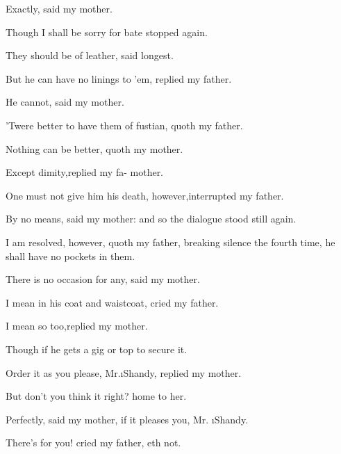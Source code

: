 \documentclass[twoside]{article}
\begin{document}
Exactly, said my mother.\tsh

\tsh Though I shall be sorry for\break
{}
bate stopped again.

\tsh They should be of leather, said\break
{}
longest.

But he can have no linings to ’em,\break
replied my father.\tsh

He cannot, said my mother.

’Twere better to have them of fustian,\break
quoth my father.

Nothing can be better, quoth my\break
mother.\tsh

\tsh Except dimity,\tsk replied my fa-\break 
{}
mother.

\tsh One must not give him his death,\break
however,\tsk interrupted my father.

By no means, said my mother:\tsh\break
and so the dialogue stood still again.



\topstrut I am resolved, however, quoth my\break 
father, breaking silence the fourth time,\break
he shall have no pockets in them.\tsh

\tsk There is no occasion for any,\break
said my mother.\tsh

I mean in his coat and waistcoat,\tsk\break
cried my father.

\tsk I mean so too,\tsk replied my\break
mother.

\tsk Though if he gets a gig or top\break
{}
to secure it.\tsh

Order it as you please, Mr.\@ \i{Shandy}, replied my
mother.\tsh



\tsh But don’t you think it right?\break
{}
home to her.

Perfectly, said my mother, if it pleases\break
you, Mr. \i{Shandy.}\tsh

\tsh There’s for you! cried my father,\break
{}
eth not.
\end{document}

